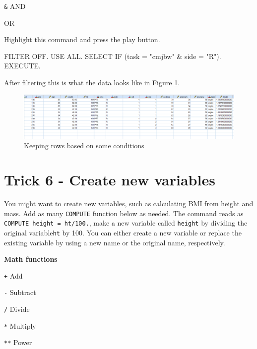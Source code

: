 \documentclass[
]{book}
\newenvironment{Shaded}{\begin{snugshade}}{\end{snugshade}}
\newcommand{\AttributeTok}[1]{\textcolor[rgb]{0.77,0.63,0.00}{#1}}
\newcommand{\FunctionTok}[1]{\textcolor[rgb]{0.00,0.00,0.00}{#1}}
\newcommand{\NormalTok}[1]{#1}
\newcommand{\SpecialCharTok}[1]{\textcolor[rgb]{0.00,0.00,0.00}{#1}}
\newcommand{\StringTok}[1]{\textcolor[rgb]{0.31,0.60,0.02}{#1}}
\begin{document}
\texttt{\&} AND

\texttt{\textbar{}} OR

Highlight this command and press the play button.

\begin{Shaded}
\begin{Highlighting}[]
\NormalTok{FILTER OFF.}
\NormalTok{USE ALL.}
\NormalTok{SELECT }\FunctionTok{IF}\NormalTok{ (}\AttributeTok{task =} \StringTok{"cmjbw"} \SpecialCharTok{\&}  \AttributeTok{side =} \StringTok{"R"}\NormalTok{).}
\NormalTok{EXECUTE.}
\end{Highlighting}
\end{Shaded}

After filtering this is what the data looks like in Figure \ref{fig:filter-row}.

\begin{figure}
\includegraphics[width=1\linewidth]{images/filter} \caption{Keeping rows based on some conditions}\label{fig:filter-row}
\end{figure}

\hypertarget{trick-6---create-new-variables}{%
\chapter*{Trick 6 - Create new variables}\label{trick-6---create-new-variables}}

You might want to create new variables, such as calculating BMI from height and mass. Add as many \texttt{COMPUTE} function below as needed. The command reads as \texttt{COMPUTE\ height\ =\ ht/100.}, make a new variable called \texttt{height} by dividing the original variable\texttt{ht} by 100. You can either create a new variable or replace the existing variable by using a new name or the original name, respectively.

\textbf{Math functions}

\texttt{+} Add

\texttt{-} Subtract

\texttt{/} Divide

\texttt{*} Multiply

\texttt{**} Power
\end{document}
